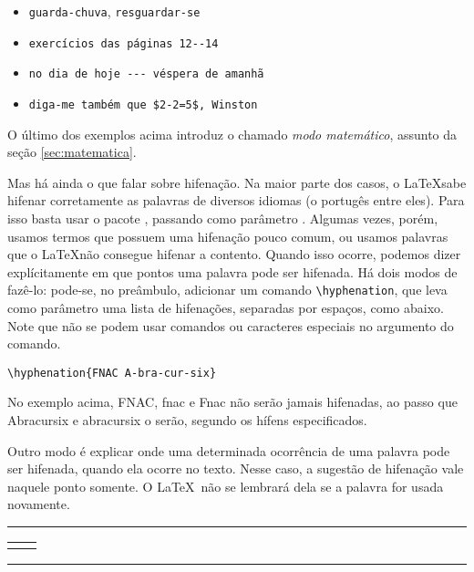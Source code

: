 \begin{itemize}\footnotesize
\item \verb'guarda-chuva', \verb'resguardar-se'
\item \verb'exercícios das páginas 12--14' 
\item \verb'no dia de hoje --- véspera de amanhã'
\item \verb'diga-me também que $2-2=5$, Winston'
\end{itemize}

O último dos exemplos acima introduz o chamado \emph{modo
  matemático}, assunto da seção
\ref{sec:matematica}.

Mas há ainda o que falar sobre hifenação. Na maior parte dos casos, o
\LaTeX sabe hifenar corretamente as palavras de diversos idiomas (o
portugês entre eles). Para isso basta usar o pacote ,
passando como parâmetro . Algumas vezes, porém,
usamos termos que possuem uma hifenação pouco comum, ou usamos
palavras que o \LaTeX não consegue hifenar a contento. Quando isso
ocorre, podemos dizer explícitamente em que pontos uma palavra pode
ser hifenada. Há dois modos de fazê-lo: pode-se, no preâmbulo,
adicionar um comando \verb'\hyphenation', que leva como parâmetro uma
lista de hifenações, separadas por espaços, como abaixo. Note que não
se podem usar comandos ou caracteres especiais no argumento do comando. 

\begin{center}
  \verb'\hyphenation{FNAC A-bra-cur-six}'
\end{center}

No exemplo acima, FNAC, fnac e Fnac não serão jamais hifenadas, ao
passo que Abracursix e abracursix o serão, segundo os hífens
especificados.

Outro modo é explicar onde uma determinada ocorrência de uma palavra
pode ser hifenada, quando ela ocorre no texto. Nesse caso, a sugestão
de hifenação vale naquele ponto somente. O \LaTeX\ não se lembrará
dela se a palavra for usada novamente.

\medskip
\begin{center}\footnotesize\hrule\smallskip
\begin{tabular}{c|c}
\begin{minipage}{.465\textwidth}

\end{minipage} &
\begin{minipage}{.465\textwidth}

\end{minipage}
\end{tabular}
\smallskip\hrule
\end{center}
\medskip

